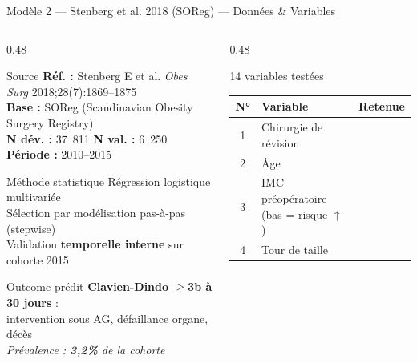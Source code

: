 \documentclass[aspectratio=169]{beamer}
\newcommand{\oui}{\textcolor{vertdoux}{\textbf{\checkmark}}}
\begin{document}
\begin{frame}[shrink=5]{Modèle 2 --- Stenberg et al. 2018 (SOReg) --- Données \& Variables}
  \begin{columns}[T]
    \begin{column}{0.48\textwidth}
      \begin{block}{Source}
        \footnotesize
        \textbf{Réf. :} Stenberg E et al. \textit{Obes Surg} 2018;28(7):1869--1875\\
        \textbf{Base :} SOReg (Scandinavian Obesity Surgery Registry)\\
        \textbf{N dév. :} 37~811 \quad \textbf{N val. :} 6~250\\
        \textbf{Période :} 2010--2015
      \end{block}
      \vspace{0.15em}
      \begin{block}{Méthode statistique}
        \footnotesize
        Régression logistique multivariée\\
        Sélection par modélisation pas-à-pas (stepwise)\\
        Validation \textbf{temporelle interne} sur cohorte 2015
      \end{block}
      \vspace{0.15em}
      \begin{block}{Outcome prédit}
        \footnotesize
        \textbf{Clavien-Dindo $\geq$3b à 30 jours} :\\
        intervention sous AG, défaillance organe, décès\\
        \textit{Prévalence : \textbf{3,2\%} de la cohorte}
      \end{block}
    \end{column}
    \begin{column}{0.48\textwidth}
      \begin{block}{14 variables testées}
        \footnotesize
        \begin{tabular}{clc}
          \toprule
          \textbf{N°} & \textbf{Variable} & \textbf{Retenue} \\
          \midrule
          1  & Chirurgie de révision & \oui \\
          2  & Âge & \oui \\
          3  & IMC préopératoire (bas = risque $\uparrow$) & \oui \\
          4  & Tour de taille & \oui \\

\end{tabular}
\end{block}
\end{column}
\end{columns}
\end{frame}
\end{document}
